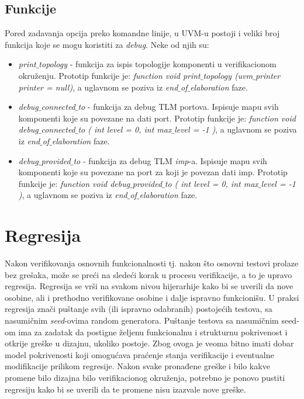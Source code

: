 
\subsection{Funkcije}

Pored zadavanja opcija preko komandne linije, u UVM-u postoji i veliki broj
funkcija koje se mogu koristiti za \emph{debug}. Neke od njih su:

\begin{itemize}
\item \emph{print\(\_\)topology} - funkcija za ispis topologije komponenti u
  verifikacionom okruženju. Prototip funkcije je: \emph{function void
    print\(\_\)topology (uvm\(\_\)printer printer = null)}, a uglavnom se poziva
  iz \emph{end\(\_\)of\(\_\)elaboration} faze.
  
\item \emph{debug\(\_\)connected\(\_\)to} - funkcija za debug TLM portova.
  Ispisuje mapu svih komponenti koje su povezane na dati port. Prototip funkcije
  je: \emph{function void debug\(\_\)connected\(\_\)to ( int level = 0, int
    max\(\_\)level = -1 )}, a uglavnom se poziva iz
  \emph{end\(\_\)of\(\_\)elaboration} faze.
  

\item \emph{debug\(\_\)provided\(\_\)to} - funkcija za debug TLM \emph{imp}-a.
  Ispisuje mapu svih komponenti koje su povezane na port za koji je povezan dati
  imp. Prototip funkcije je: \emph{function void debug\(\_\)provided\(\_\)to (
    int level = 0, int max\(\_\)level = -1 )}, a uglavnom se poziva iz
  \emph{end\(\_\)of\(\_\)elaboration} faze.
\end{itemize}


\section{Regresija}

Nakon verifikovanja osnovnih funkcionalnosti tj. nakon što osnovni testovi
prolaze bez grešaka, može se preći na sledeći korak u procesu verifikacije, a to
je upravo regresija. Regresija se vrši na svakom nivou hijerarhije kako bi se
uverili da nove osobine, ali i prethodno verifikovane osobine i dalje ispravno
funkcionišu. U praksi regresija znači puštanje svih (ili ispravno odabranih)
postojećih testova, sa nasumičnim \emph{seed}-ovima random generatora. Puštanje
testova sa nasumičnim seed-om ima za zadatak da postigne željenu funkcionalnu i
strukturnu pokrivenost i otkrije greške u dizajnu, ukoliko postoje. Zbog ovoga
je veoma bitno imati dobar model pokrivenosti koji omogućava praćenje stanja
verifikacije i eventualne modifikacije prilikom regresije. Nakon svake
pronađene greške i bilo kakve promene bilo dizajna bilo verifikacionog
okruženja, potrebno je ponovo pustiti regresiju kako bi se uverili da te promene
nisu izazvale nove greške.\\


